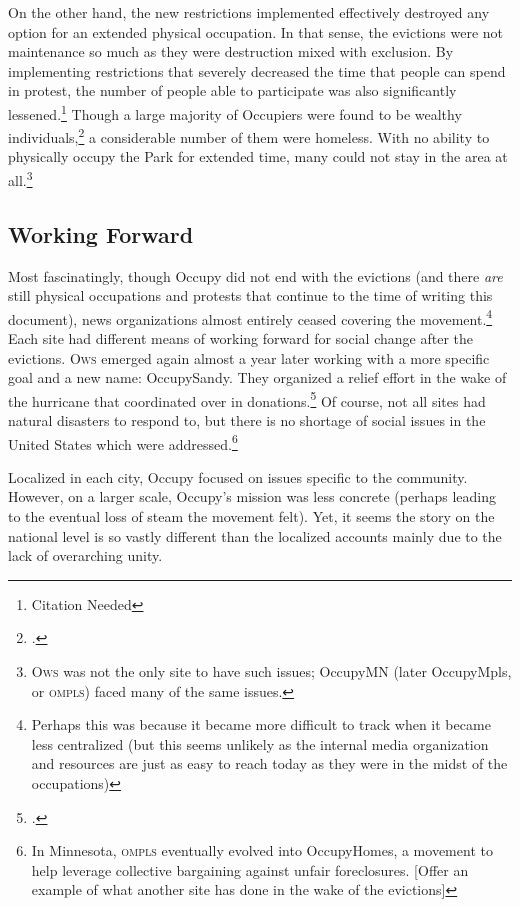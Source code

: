 \documentclass{article}
\begin{document}
On the other hand, the new restrictions implemented effectively destroyed any option for an extended physical occupation.
In that sense, the evictions were not maintenance so much as they were destruction mixed with exclusion.
By implementing restrictions that severely decreased the time that people can spend in protest, the number of people able to participate was also significantly lessened.\footnote{Citation Needed}
Though a large majority of Occupiers were found to be wealthy individuals,\footcite[10]{milkman13} a considerable number of them were homeless.
With no ability to physically occupy the Park for extended time, many could not stay in the area at all.\footnote{\textsc{Ows} was not the only site to have such issues; OccupyMN (later OccupyMpls, or \textsc{ompls}) faced many of the same issues.}

\subsection{Working Forward}
Most fascinatingly, though Occupy did not end with the evictions (and there \emph{are} still physical occupations and protests that continue to the time of writing this document), news organizations almost entirely ceased covering the movement.\footnote{Perhaps this was because it became more difficult to track when it became less centralized (but this seems unlikely as the internal media organization and resources are just as easy to reach today as they were in the midst of the occupations)}
Each site had different means of working forward for social change after the evictions.
\textsc{Ows} emerged again almost a year later working with a more specific goal and a new name: OccupySandy.
They organized a relief effort in the wake of the hurricane that coordinated over  in donations.\footcite[35--36]{milkman13}
Of course, not all sites had natural disasters to respond to, but there is no shortage of social issues in the United States which were addressed.\footnote{In Minnesota, \textsc{ompls} eventually evolved into OccupyHomes, a movement to help leverage collective bargaining against unfair foreclosures. [Offer an example of what another site has done in the wake of the evictions]}

Localized in each city, Occupy focused on issues specific to the community.
However, on a larger scale, Occupy's mission was less concrete (perhaps leading to the eventual loss of steam the movement felt).
Yet, it seems the story on the national level is so vastly different than the localized accounts mainly due to the lack of overarching unity.
\end{document}
